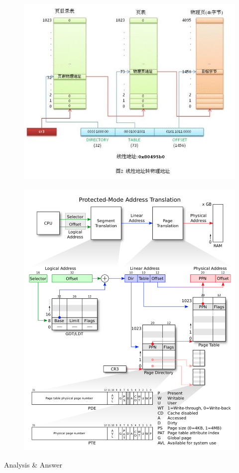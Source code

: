 \begin{figure}[H]
\centering
\includegraphics[width=0.8\linewidth]{figure/address_transform_2}
\end{figure}

\begin{figure}[H]
\centering
\includegraphics[width=0.8\linewidth]{figure/address_transform}
\end{figure}

\begin{flushleft}
{\Large Analysis \& Answer}
\end{flushleft}

